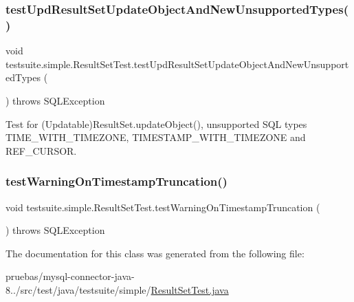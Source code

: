 \subsubsection{\texorpdfstring{test\+Upd\+Result\+Set\+Update\+Object\+And\+New\+Unsupported\+Types()}{testUpdResultSetUpdateObjectAndNewUnsupportedTypes()}}
{\footnotesize\ttfamily void testsuite.\+simple.\+Result\+Set\+Test.\+test\+Upd\+Result\+Set\+Update\+Object\+And\+New\+Unsupported\+Types (\begin{DoxyParamCaption}{ }\end{DoxyParamCaption}) throws S\+Q\+L\+Exception}

Test for (Updatable)Result\+Set.\+update\+Object(), unsupported S\+QL types T\+I\+M\+E\+\_\+\+W\+I\+T\+H\+\_\+\+T\+I\+M\+E\+Z\+O\+NE, T\+I\+M\+E\+S\+T\+A\+M\+P\+\_\+\+W\+I\+T\+H\+\_\+\+T\+I\+M\+E\+Z\+O\+NE and R\+E\+F\+\_\+\+C\+U\+R\+S\+OR. \mbox{\label{classtestsuite_1_1simple_1_1_result_set_test_a3331de6ce65d06bf37a254212a523c04}} 
\subsubsection{\texorpdfstring{test\+Warning\+On\+Timestamp\+Truncation()}{testWarningOnTimestampTruncation()}}
{\footnotesize\ttfamily void testsuite.\+simple.\+Result\+Set\+Test.\+test\+Warning\+On\+Timestamp\+Truncation (\begin{DoxyParamCaption}{ }\end{DoxyParamCaption}) throws S\+Q\+L\+Exception}



The documentation for this class was generated from the following file\+:\begin{DoxyCompactItemize}
\item 
pruebas/mysql-\/connector-\/java-\/8../src/test/java/testsuite/simple/\mbox{\hyperlink{_result_set_test_8java}{Result\+Set\+Test.\+java}}\end{DoxyCompactItemize}

